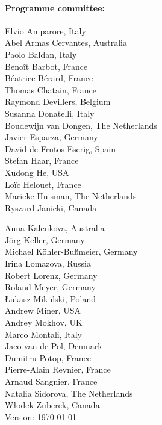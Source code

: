 \documentclass[10pt,a4paper]{article}
\begin{document}
\begin{multicols}{2}
\paragraph*{Programme committee:}\mbox{}
\vspace*{-1em}
\begin{multicols}{2}
\noindent Elvio Amparore, Italy \\
Abel Armas Cervantes, Australia \\
Paolo Baldan, Italy \\
Benoît Barbot, France \\
Béatrice Bérard, France \\
Thomas Chatain, France \\
Raymond Devillers, Belgium \\
Susanna Donatelli, Italy \\
Boudewijn van Dongen, The Netherlands \\
Javier Esparza, Germany \\
David de Frutos Escrig, Spain \\
Stefan Haar, France \\
Xudong He, USA \\
Loïc Helouet, France \\
Marieke Huisman, The Netherlands \\
Ryszard Janicki, Canada \\

\columnbreak

\noindent 
Anna Kalenkova, Australia \\
Jörg Keller, Germany \\
Michael Köhler-Bußmeier, Germany \\
Irina Lomazova, Russia \\
Robert Lorenz, Germany \\
Roland Meyer, Germany \\
{\L}ukasz Mikulski, Poland \\
Andrew Miner, USA \\
Andrey Mokhov, UK\\
Marco Montali, Italy \\
Jaco van de Pol, Denmark \\
Dumitru Potop, France\\
Pierre-Alain Reynier, France \\
Arnaud Sangnier, France \\
Natalia Sidorova, The Netherlands \\
W{\l}odek Zuberek, Canada \\
{\tiny \textcolor{black!2}{Version: \today{}}}
\end{multicols}
\end{multicols}
\end{document}
